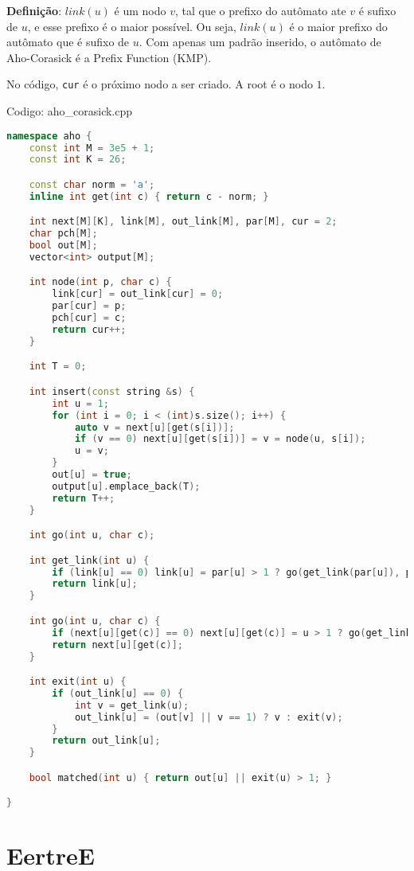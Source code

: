 \documentclass[10pt, a4paper, oneside]{book}
\begin{document}
\textbf{Definição}: $link(u)$ é um nodo $v$, tal que o prefixo do autômato ate $v$ é sufixo de $u$, e esse prefixo é o maior possível. Ou seja, $link(u)$ é o maior prefixo do autômato que é sufixo de $u$. Com apenas um padrão inserido, o autômato de Aho-Corasick é a Prefix Function (KMP).



No código, \texttt{cur} é o próximo nodo a ser criado. A root é o nodo $1$.
\hfill

Codigo: aho\_corasick.cpp

\begin{lstlisting}[language=C++]
namespace aho {
    const int M = 3e5 + 1;
    const int K = 26;

    const char norm = 'a';
    inline int get(int c) { return c - norm; }

    int next[M][K], link[M], out_link[M], par[M], cur = 2;
    char pch[M];
    bool out[M];
    vector<int> output[M];

    int node(int p, char c) {
        link[cur] = out_link[cur] = 0;
        par[cur] = p;
        pch[cur] = c;
        return cur++;
    }

    int T = 0;

    int insert(const string &s) {
        int u = 1;
        for (int i = 0; i < (int)s.size(); i++) {
            auto v = next[u][get(s[i])];
            if (v == 0) next[u][get(s[i])] = v = node(u, s[i]);
            u = v;
        }
        out[u] = true;
        output[u].emplace_back(T);
        return T++;
    }

    int go(int u, char c);

    int get_link(int u) {
        if (link[u] == 0) link[u] = par[u] > 1 ? go(get_link(par[u]), pch[u]) : 1;
        return link[u];
    }

    int go(int u, char c) {
        if (next[u][get(c)] == 0) next[u][get(c)] = u > 1 ? go(get_link(u), c) : 1;
        return next[u][get(c)];
    }

    int exit(int u) {
        if (out_link[u] == 0) {
            int v = get_link(u);
            out_link[u] = (out[v] || v == 1) ? v : exit(v);
        }
        return out_link[u];
    }

    bool matched(int u) { return out[u] || exit(u) > 1; }

}\end{lstlisting}
\hfill

\section{EertreE}
\end{document}
